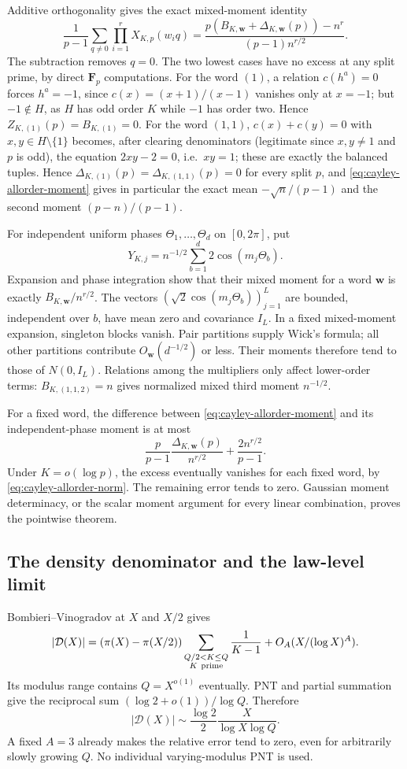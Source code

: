 Additive orthogonality gives the exact mixed-moment identity
\begin{equation}
 \frac1{p-1}\sum_{q\ne0}\prod_{i=1}^rX_{K,p}(w_iq)
 =\frac{p(B_{K,\boldsymbol w}+\Delta_{K,\boldsymbol w}(p))-n^r}
 {(p-1)n^{r/2}}.
 \label{eq:cayley-allorder-moment}
\end{equation}
The subtraction removes $q=0$. The two lowest cases have no excess at any
split prime, by direct $\mathbf F_p$ computations. For the word $(1)$, a
relation $c(h^a)=0$ forces $h^a=-1$, since $c(x)=(x+1)/(x-1)$ vanishes only
at $x=-1$; but $-1\notin H$, as $H$ has odd order $K$ while $-1$ has order
two. Hence $Z_{K,(1)}(p)=B_{K,(1)}=0$. For the word $(1,1)$,
$c(x)+c(y)=0$ with $x,y\in H\setminus\{1\}$ becomes, after clearing
denominators (legitimate since $x,y\ne1$ and $p$ is odd), the equation
$2xy-2=0$, i.e.\ $xy=1$; these are exactly the balanced tuples. Hence
$\Delta_{K,(1)}(p)=\Delta_{K,(1,1)}(p)=0$ for every split $p$, and
\eqref{eq:cayley-allorder-moment} gives in particular the exact mean
$-\sqrt n/(p-1)$ and the second moment $(p-n)/(p-1)$.

For independent uniform phases $\Theta_1,\ldots,\Theta_d$ on $[0,2\pi]$, put
\[
 Y_{K,j}=n^{-1/2}\sum_{b=1}^d2\cos(m_j\Theta_b).
\]
Expansion and phase integration show that their mixed moment for a word
$\boldsymbol w$ is exactly $B_{K,\boldsymbol w}/n^{r/2}$.
The vectors $(\sqrt2\cos(m_j\Theta_b))_{j=1}^L$ are bounded, independent
over $b$, have mean zero and covariance $I_L$. In a fixed mixed-moment
expansion, singleton blocks vanish. Pair partitions supply Wick's formula;
all other partitions contribute $O_{\boldsymbol w}(d^{-1/2})$ or less.
Their moments therefore tend to those of $N(0,I_L)$.
Relations among the multipliers only affect lower-order terms:
$B_{K,(1,1,2)}=n$ gives normalized mixed third moment $n^{-1/2}$.

For a fixed word, the difference between
\eqref{eq:cayley-allorder-moment} and its independent-phase moment is at most
\[
 \frac p{p-1}\frac{\Delta_{K,\boldsymbol w}(p)}{n^{r/2}}
 +\frac{2n^{r/2}}{p-1}.
\]
Under $K=o(\log p)$, the excess eventually vanishes for each fixed word,
by \eqref{eq:cayley-allorder-norm}. The remaining error tends to zero.
Gaussian moment determinacy, or the scalar moment argument for every linear
combination, proves the pointwise theorem.

\subsection{The density denominator and the law-level limit}
Bombieri--Vinogradov at $X$ and $X/2$ gives
\[
 |\mathcal D(X)|=
 (\pi(X)-\pi(X/2))
 \sum_{\substack{Q/2<K\le Q\\K\ {\rm prime}}}\frac1{K-1}
 +O_A(X/(\log X)^A).
\]
Its modulus range contains $Q=X^{o(1)}$ eventually. PNT and partial summation
give the reciprocal sum $(\log2+o(1))/\log Q$. Therefore
\[
 |\mathcal D(X)|\sim\frac{\log2}{2}\frac X{\log X\log Q}.
\]
A fixed $A=3$ already makes the relative error tend to zero, even for
arbitrarily slowly growing $Q$. No individual varying-modulus PNT is used.

